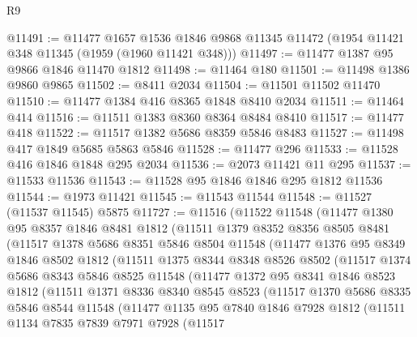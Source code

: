 \begin{lexlean}{R9}
\begin{coremodule}
@11491 := @11477
    @1657
    @1536
    @1846
    @9868
    @11345
    @11472
    (@1954 @11421 @348 @11345 (@1959 (@1960 @11421 @348)))
@11497 := @11477 @1387 @95 @9866 @1846 @11470 @1812
@11498 := @11464 @180
@11501 := @11498 @1386 @9860 @9865
@11502 := @8411 @2034
@11504 := @11501 @11502 @11470
@11510 := @11477 @1384 @416 @8365 @1848 @8410 @2034
@11511 := @11464 @414
@11516 := @11511 @1383 @8360 @8364 @8484 @8410
@11517 := @11477 @418
@11522 := @11517 @1382 @5686 @8359 @5846 @8483
@11527 := @11498 @417 @1849 @5685 @5863 @5846
@11528 := @11477 @296
@11533 := @11528 @416 @1846 @1848 @295 @2034
@11536 := @2073 @11421 @11 @295
@11537 := @11533 @11536
@11543 := @11528 @95 @1846 @1846 @295 @1812 @11536
@11544 := @1973 @11421
@11545 := @11543 @11544
@11548 := @11527 (@11537 @11545) @5875
@11727 := @11516
    (@11522
      @11548
      (@11477
        @1380
        @95
        @8357
        @1846
        @8481
        @1812
        (@11511
          @1379
          @8352
          @8356
          @8505
          @8481
          (@11517
            @1378
            @5686
            @8351
            @5846
            @8504
            @11548
            (@11477
              @1376
              @95
              @8349
              @1846
              @8502
              @1812
              (@11511
                @1375
                @8344
                @8348
                @8526
                @8502
                (@11517
                  @1374
                  @5686
                  @8343
                  @5846
                  @8525
                  @11548
                  (@11477
                    @1372
                    @95
                    @8341
                    @1846
                    @8523
                    @1812
                    (@11511
                      @1371
                      @8336
                      @8340
                      @8545
                      @8523
                      (@11517
                        @1370
                        @5686
                        @8335
                        @5846
                        @8544
                        @11548
                        (@11477
                          @1135
                          @95
                          @7840
                          @1846
                          @7928
                          @1812
                          (@11511
                            @1134
                            @7835
                            @7839
                            @7971
                            @7928
                            (@11517

\end{coremodule}
\end{lexlean}
